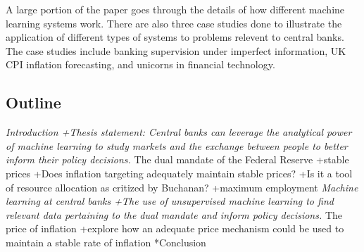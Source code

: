 \documentclass[11pt,]{article}
\begin{document}
A large portion of the paper goes through the details of how different
machine learning systems work. There are also three case studies done to
illustrate the application of different types of systems to problems
relevent to central banks. The case studies include banking supervision
under imperfect information, UK CPI inflation forecasting, and unicorns
in financial technology.

\subsection{Outline}\label{outline}

\emph{Introduction +Thesis statement: Central banks can leverage the
analytical power of machine learning to study markets and the exchange
between people to better inform their policy decisions. }The dual
mandate of the Federal Reserve +stable prices +Does inflation targeting
adequately maintain stable prices? +Is it a tool of resource allocation
as critized by Buchanan? +maximum employment \emph{Machine learning at
central banks +The use of unsupervised machine learning to find relevant
data pertaining to the dual mandate and inform policy decisions. }The
price of inflation +explore how an adequate price mechanism could be
used to maintain a stable rate of inflation *Conclusion

\newpage
\singlespacing 

\end{document}
